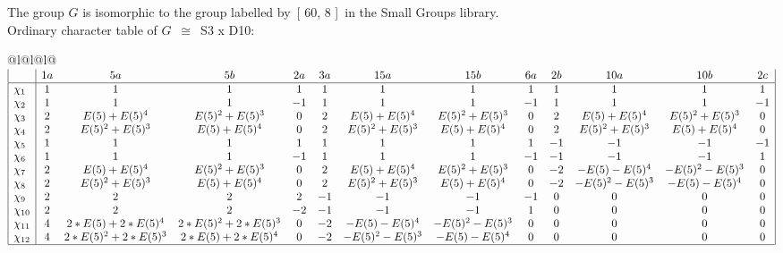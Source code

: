 \documentclass[varwidth=\maxdimen,border=10]{standalone}
\begin{document}
The group $G$ is isomorphic to the group labelled by\ [ 60, 8 ]\ in the Small Groups library.\\
Ordinary character table of $G$\ $\cong$\ S3 x D10:\\
\begin{center}
\begin{tabular}{@{}l@{}l@{}l@{}}
\hline
\(\begin{array}{|l|cccccccccccc|}
  & 1a & 5a & 5b & 2a & 3a & 15a & 15b & 6a & 2b & 10a & 10b & 2c\\ \hline
\chi_{1} & 1 & 1 & 1 & 1 & 1 & 1 & 1 & 1 & 1 & 1 & 1 & 1\\
\chi_{2} & 1 & 1 & 1 & -1 & 1 & 1 & 1 & -1 & 1 & 1 & 1 & -1\\
\chi_{3} & 2 & E(5)+E(5)^{4} & E(5)^{2}+E(5)^{3} & 0 & 2 & E(5)+E(5)^{4} & E(5)^{2}+E(5)^{3} & 0 & 2 & E(5)+E(5)^{4} & E(5)^{2}+E(5)^{3} & 0\\
\chi_{4} & 2 & E(5)^{2}+E(5)^{3} & E(5)+E(5)^{4} & 0 & 2 & E(5)^{2}+E(5)^{3} & E(5)+E(5)^{4} & 0 & 2 & E(5)^{2}+E(5)^{3} & E(5)+E(5)^{4} & 0\\
\chi_{5} & 1 & 1 & 1 & 1 & 1 & 1 & 1 & 1 & -1 & -1 & -1 & -1\\
\chi_{6} & 1 & 1 & 1 & -1 & 1 & 1 & 1 & -1 & -1 & -1 & -1 & 1\\
\chi_{7} & 2 & E(5)+E(5)^{4} & E(5)^{2}+E(5)^{3} & 0 & 2 & E(5)+E(5)^{4} & E(5)^{2}+E(5)^{3} & 0 & -2 & -E(5)-E(5)^{4} & -E(5)^{2}-E(5)^{3} & 0\\
\chi_{8} & 2 & E(5)^{2}+E(5)^{3} & E(5)+E(5)^{4} & 0 & 2 & E(5)^{2}+E(5)^{3} & E(5)+E(5)^{4} & 0 & -2 & -E(5)^{2}-E(5)^{3} & -E(5)-E(5)^{4} & 0\\
\chi_{9} & 2 & 2 & 2 & 2 & -1 & -1 & -1 & -1 & 0 & 0 & 0 & 0\\
\chi_{10} & 2 & 2 & 2 & -2 & -1 & -1 & -1 & 1 & 0 & 0 & 0 & 0\\
\chi_{11} & 4 & 2*E(5)+2*E(5)^{4} & 2*E(5)^{2}+2*E(5)^{3} & 0 & -2 & -E(5)-E(5)^{4} & -E(5)^{2}-E(5)^{3} & 0 & 0 & 0 & 0 & 0\\
\chi_{12} & 4 & 2*E(5)^{2}+2*E(5)^{3} & 2*E(5)+2*E(5)^{4} & 0 & -2 & -E(5)^{2}-E(5)^{3} & -E(5)-E(5)^{4} & 0 & 0 & 0 & 0 & 0\\
\hline
\end{array}\)\\
\end{tabular}
\end{center}
\end{document}
